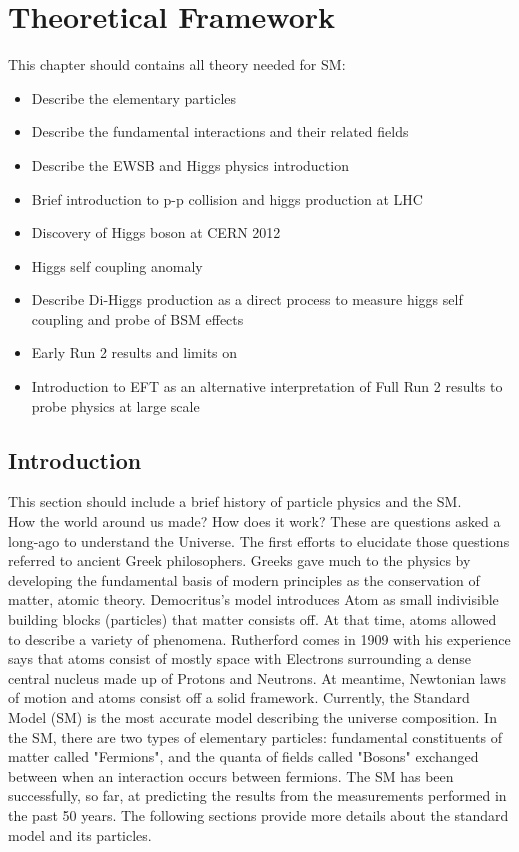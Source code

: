 \newpage
\chapter{Theoretical Framework}
\label{chap1}

This chapter should contains all theory needed for SM:
\begin{itemize}
    \item Describe the elementary particles 
    \item Describe the fundamental interactions and their related fields
    \item Describe the EWSB and Higgs physics introduction
    \item Brief introduction to p-p collision and higgs production at LHC
    \item Discovery of Higgs boson at CERN 2012
    \item Higgs self coupling anomaly
    \item Describe Di-Higgs production as a direct process to measure higgs self coupling and probe of BSM effects
    \item Early Run 2 results and limits on \kl
    \item Introduction to EFT as an alternative interpretation of Full Run 2 results to probe physics at large scale 
\end{itemize}

\section{Introduction}
\label{chap1:intro}

This section should include a brief history of particle physics and the SM. \\

How the world around us made? How does it work? These are questions asked a long-ago to understand the Universe. The first efforts to elucidate those questions referred to ancient Greek philosophers. Greeks gave much to the physics by developing the fundamental basis of modern principles as the conservation of matter, atomic theory. Democritus's model introduces Atom as small indivisible building blocks (particles) that matter consists off. At that time, atoms allowed to describe a variety of phenomena. Rutherford comes in 1909 with his experience says that atoms consist of mostly space with Electrons surrounding a dense central nucleus made up of Protons and Neutrons. At meantime, Newtonian laws of motion and atoms consist off a solid framework. Currently, the Standard Model (SM) is the most accurate model describing the universe composition. In the SM, there are two types of elementary particles: fundamental constituents of matter called "Fermions", and the quanta of fields called "Bosons" exchanged between when an interaction occurs between fermions. The SM has been successfully, so far, at predicting the results from the measurements performed in the past 50 years. The following sections provide more details about the standard model and its particles.

